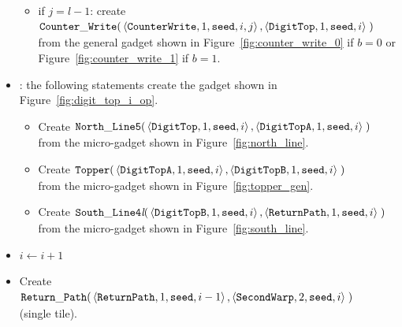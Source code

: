 \begin{itemize}
\begin{itemize}
        \item if $j = l-1$: create
        $\begin{aligned}[t]
            {\tt Counter\_Write}(&\left\langle {\tt CounterWrite}, 1, {\tt seed}, i, j \right\rangle, \left\langle {\tt DigitTop}, 1, {\tt seed}, i \right\rangle \;)
        \end{aligned}$\\from the general gadget shown in Figure~\ref{fig:counter_write_0} if $b = 0$ or Figure~\ref{fig:counter_write_1} if $b = 1$.
    \end{itemize}


    \item {\dtop}: the following statements create the gadget shown in Figure~\ref{fig:digit_top_i_op}.
    \begin{itemize}
        \item Create
        $\begin{aligned}[t]
            {\tt North\_Line5}(& \left \langle {\tt DigitTop},  1, {\tt seed}, i \right\rangle,
                                 \left \langle {\tt DigitTopA}, 1, {\tt seed}, i \right\rangle \;)
        \end{aligned}$\\ from the micro-gadget shown in Figure~\ref{fig:north_line}.

        \item Create
        $\begin{aligned}[t]
            {\tt Topper}(& \left\langle {\tt DigitTopA}, 1, {\tt seed}, i \right\rangle,
                           \left\langle {\tt DigitTopB}, 1, {\tt seed}, i \right\rangle \;)
        \end{aligned}$\\ from the micro-gadget shown in Figure~\ref{fig:topper_gen}.

        \item Create
        $\begin{aligned}[t]
            {\tt South\_Line4\textit{l}}(& \left\langle {\tt DigitTopB},  1, {\tt seed}, i\right\rangle,
                                           \left\langle {\tt ReturnPath}, 1, {\tt seed}, i\right\rangle \;)
        \end{aligned}$\\ from the micro-gadget shown in Figure~\ref{fig:south_line}.
    \end{itemize}

    \item $i \gets i + 1$

    \item Create
    $\begin{aligned}[t]
            {\tt Return\_Path}(&\left\langle {\tt ReturnPath}, 1, {\tt seed}, i - 1\right\rangle,
                         \left\langle {\tt SecondWarp}, 2, {\tt seed}, i    \right\rangle \;)
    \end{aligned}$\\ (single tile).


\end{itemize}
